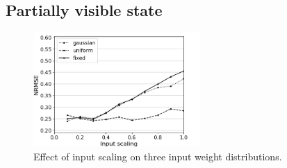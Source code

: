 

\subsection{Partially visible state}

\begin{figure}[H]
  \centering
  \includegraphics[width=2.5in]{img/input_scaling_distrib.png}
  \caption{
    Effect of input scaling on three input weight distributions.
  }
  \label{input_scaling_distrib}
\end{figure}

